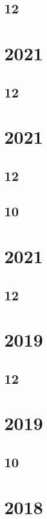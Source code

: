\documentclass[11pt]{book}
\begin{document}
\subsection{12}

\section{2021}
\subsection{12}

\section{2021}
\subsection{12}

\subsection{10}

\section{2021}
\subsection{12}

\section{2019}
\subsection{12}







\section{2019}
\subsection{10}


\section{2018}
\end{document}
